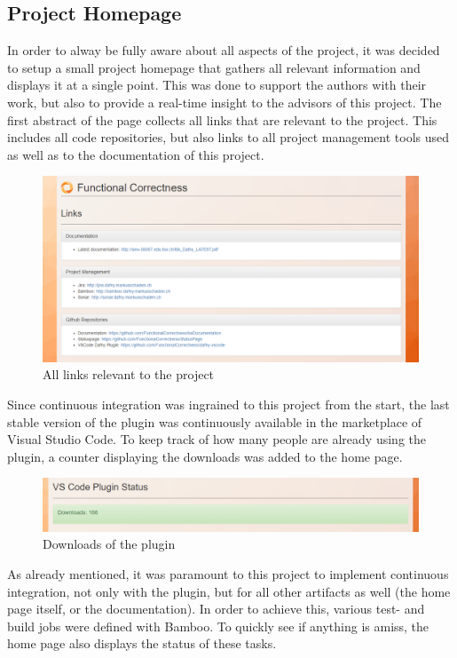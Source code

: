 \subsection{Project Homepage}
In order to alway be fully aware about all aspects of the project, it was decided to setup a small project homepage that gathers all relevant information and displays it at a single point. This was done to support the authors with their work, but also to provide a real-time insight to the advisors of this project. \newline
The first abstract of the page collects all links that are relevant to the project. This includes all code repositories, but also links to all project management tools used as well as to the documentation of this project.  \newline
\begin{figure}[H]
	\centering
	\includegraphics[width=1\textwidth]{img/homeLinks}
	\caption{All links relevant to the project}
	\label{fig:Project Links}
\end{figure}
Since continuous integration was ingrained to this project from the start, the last stable version of the plugin was continuously available in the marketplace of Visual Studio Code. To keep track of how many people are already using the plugin, a counter displaying the downloads was added to the home page. \newline
\begin{figure}[H]
	\centering
	\includegraphics[width=1\textwidth]{img/homeCounter}
	\caption{Downloads of the plugin}
	\label{fig:Plugin Downloads}
\end{figure}
As already mentioned, it was paramount to this project to implement continuous integration, not only with the plugin, but for all other artifacts as well (the home page itself, or the documentation). In order to achieve this, various test- and build jobs were defined with Bamboo. To quickly see if anything is amiss, the home page also displays the status of these tasks. \newline
